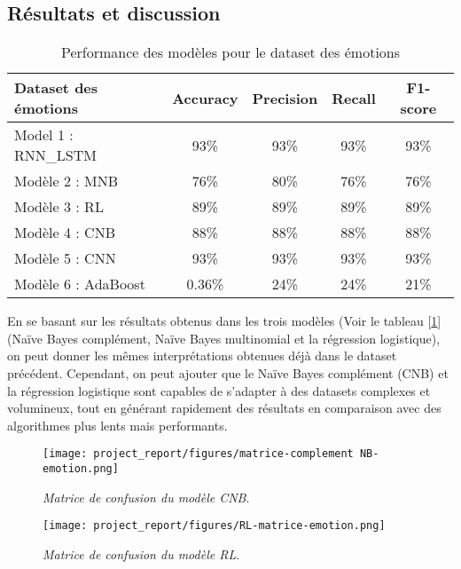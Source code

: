 \subsection{Résultats et discussion}

\begin{table}[h!]
    \centering
    \caption{Performance des modèles pour le dataset des émotions}
    \label{tab:Em}
    \begin{tabular}{lcccc}
        \toprule
        Dataset des émotions & Accuracy & Precision & Recall & F1-score \\
        \midrule
        Model 1 : RNN\_LSTM & 93\% & 93\% & 93\% & 93\% \\
        Modèle 2 : MNB & 76\% & 80\% & 76\% & 76\% \\
        Modèle 3 : RL & 89\% & 89\% & 89\% & 89\% \\
        Modèle 4 : CNB & 88\% & 88\% & 88\% & 88\% \\
        Modèle 5 : CNN & 93\% & 93\% & 93\% & 93\% \\
        Modèle 6 : AdaBoost & 0.36\% & 24\% & 24\% & 21\% \\
        \bottomrule
    \end{tabular}
\end{table}
En se basant sur les résultats obtenus dans les trois modèles (Voir le tableau [\ref{tab:Em}] (Naïve Bayes complément, Naïve Bayes multinomial et la régression logistique), on peut donner les mêmes interprétations obtenues déjà dans le dataset précédent. Cependant, on peut ajouter que le Naïve Bayes complément (CNB) et la régression logistique sont capables de s'adapter à des datasets complexes et volumineux, tout en générant rapidement des résultats en comparaison avec des algorithmes plus lents mais performants.\par
\begin{figure}[h]
    \centering
    \begin{minipage}{0.45\textwidth}
        \centering
        \texttt{[image: project\_report/figures/matrice-complement NB-emotion.png]}
        \caption{\textit{Matrice de confusion du modèle CNB}.}
        \label{fig:figureSHJJJR}
    \end{minipage}\hfill
    \begin{minipage}{0.45\textwidth}
        \centering
        \texttt{[image: project\_report/figures/RL-matrice-emotion.png]}
        \caption{\textit{Matrice de confusion du modèle RL}.}
        \label{fig:figureNBVV}
    \end{minipage}
\end{figure} 


